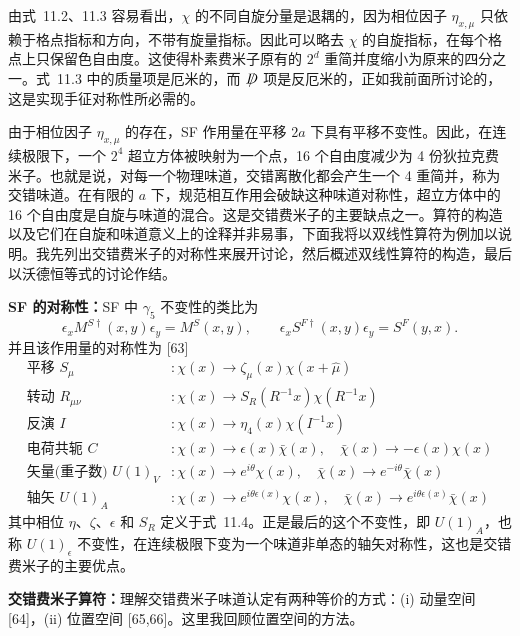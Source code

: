 由式~11.2、11.3 容易看出，$\chi$ 的不同自旋分量是退耦的，因为相位因子 $\eta_{x,\mu}$ 只依赖于格点指标和方向，不带有旋量指标。因此可以略去 $\chi$ 的自旋指标，在每个格点上只保留色自由度。这使得朴素费米子原有的 $2^d$ 重简并度缩小为原来的四分之一。式~11.3 中的质量项是厄米的，而 $\slashed{D}$ 项是反厄米的，正如我前面所讨论的，这是实现手征对称性所必需的。

由于相位因子 $\eta_{x,\mu}$ 的存在，SF 作用量在平移 $2a$ 下具有平移不变性。因此，在连续极限下，一个 $2^4$ 超立方体被映射为一个点，16 个自由度减少为 4 份狄拉克费米子。也就是说，对每一个物理味道，交错离散化都会产生一个 4 重简并，称为交错味道。在有限的 $a$ 下，规范相互作用会破缺这种味道对称性，超立方体中的 16 个自由度是自旋与味道的混合。这是交错费米子的主要缺点之一。算符的构造以及它们在自旋和味道意义上的诠释并非易事，下面我将以双线性算符为例加以说明。我先列出交错费米子的对称性来展开讨论，然后概述双线性算符的构造，最后以沃德恒等式的讨论作结。

\textbf{SF 的对称性：}SF 中 $\gamma_5$ 不变性的类比为
\begin{equation}
\epsilon_x M^{S\dagger}(x,y)\epsilon_y = M^S(x,y),
\qquad \epsilon_x S^{F\dagger}(x,y)\epsilon_y = S^F(y,x) .
\label{eq:sf-gamma5-analog}
\end{equation}
并且该作用量的对称性为 [63]
\begin{align*}
\text{平移 } S_\mu &: \chi(x) \to \zeta_\mu(x)\chi(x+\hat{\mu}) \\
\text{转动 } R_{\mu\nu} &: \chi(x) \to S_R(R^{-1}x)\chi(R^{-1}x) \\
\text{反演 } I &: \chi(x) \to \eta_4(x)\chi(I^{-1}x) \\
\text{电荷共轭 } C &: \chi(x) \to \epsilon(x)\bar{\chi}(x),
\quad \bar{\chi}(x) \to -\epsilon(x)\chi(x) \\
\text{矢量(重子数) } U(1)_V &: \chi(x) \to e^{i\theta}\chi(x),
\quad \bar{\chi}(x) \to e^{-i\theta}\bar{\chi}(x) \\
\text{轴矢 } U(1)_A &: \chi(x) \to e^{i\theta\epsilon(x)}\chi(x),
\quad \bar{\chi}(x) \to e^{i\theta\epsilon(x)}\bar{\chi}(x)
\end{align*}
其中相位 $\eta$、$\zeta$、$\epsilon$ 和 $S_R$ 定义于式~11.4。正是最后的这个不变性，即 $U(1)_A$，也称 $U(1)_\epsilon$ 不变性，在连续极限下变为一个味道非单态的轴矢对称性，这也是交错费米子的主要优点。

\textbf{交错费米子算符：}理解交错费米子味道认定有两种等价的方式：(i) 动量空间 [64]，(ii) 位置空间 [65,66]。这里我回顾位置空间的方法。

